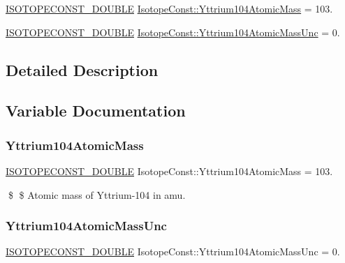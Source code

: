 \begin{DoxyCompactItemize}
\item 
\mbox{\hyperlink{group___isotope_const-_macros_ga8f45a7272ce02c0b4c65c44636ed719a}{I\+S\+O\+T\+O\+P\+E\+C\+O\+N\+S\+T\+\_\+\+D\+O\+U\+B\+LE}} \mbox{\hyperlink{group___isotope_const-_yttrium-_y104_gae2852e59f5893f48433f512f7a4efa13}{Isotope\+Const\+::\+Yttrium104\+Atomic\+Mass}} = 103.
\item 
\mbox{\hyperlink{group___isotope_const-_macros_ga8f45a7272ce02c0b4c65c44636ed719a}{I\+S\+O\+T\+O\+P\+E\+C\+O\+N\+S\+T\+\_\+\+D\+O\+U\+B\+LE}} \mbox{\hyperlink{group___isotope_const-_yttrium-_y104_gaa8dbad4b6456e16cd65e53cd5cca7746}{Isotope\+Const\+::\+Yttrium104\+Atomic\+Mass\+Unc}} = 0.
\end{DoxyCompactItemize}


\subsection{Detailed Description}


\subsection{Variable Documentation}
\mbox{\label{group___isotope_const-_yttrium-_y104_gae2852e59f5893f48433f512f7a4efa13}} 
\subsubsection{\texorpdfstring{Yttrium104\+Atomic\+Mass}{Yttrium104AtomicMass}}
{\footnotesize\ttfamily \mbox{\hyperlink{group___isotope_const-_macros_ga8f45a7272ce02c0b4c65c44636ed719a}{I\+S\+O\+T\+O\+P\+E\+C\+O\+N\+S\+T\+\_\+\+D\+O\+U\+B\+LE}} Isotope\+Const\+::\+Yttrium104\+Atomic\+Mass = 103.}

\$ \$ Atomic mass of Yttrium-\/104 in amu. \mbox{\label{group___isotope_const-_yttrium-_y104_gaa8dbad4b6456e16cd65e53cd5cca7746}} 
\subsubsection{\texorpdfstring{Yttrium104\+Atomic\+Mass\+Unc}{Yttrium104AtomicMassUnc}}
{\footnotesize\ttfamily \mbox{\hyperlink{group___isotope_const-_macros_ga8f45a7272ce02c0b4c65c44636ed719a}{I\+S\+O\+T\+O\+P\+E\+C\+O\+N\+S\+T\+\_\+\+D\+O\+U\+B\+LE}} Isotope\+Const\+::\+Yttrium104\+Atomic\+Mass\+Unc = 0.}


